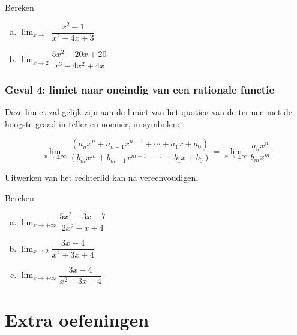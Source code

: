 \documentclass[12pt]{article}
\newenvironment{eigenschap}
{
  \vspace{0.4cm}
  \begin{mdframed}[nobreak=true,frametitle={Eigenschap}]
  }{%
  \end{mdframed}
}
\begin{document}
\begin{oefening}
  Bereken
  \begin{enumerate}[(a)]
  \itemsep.5em
  \item $\displaystyle\lim_{x\to1}\dfrac{x^2-1}{x^2-4x+3}$
  \item $\displaystyle\lim_{x\to2}\dfrac{5x^2-20x+20}{x^3-4x^2+4x}$
  \end{enumerate}
\end{oefening}

\begin{theorie}

\subsubsection*{Geval 4: limiet naar oneindig van een rationale functie}

Deze limiet zal gelijk zijn aan de limiet van het quotiën van de termen met de hoogste graad in teller en noemer, in symbolen:

\begin{eigenschap}
  $$\lim_{x\to \pm\infty}\dfrac{\left(a_nx^n+a_{n-1}x^{n-1}+\cdots+a_1x+a_0\right)}{\left(b_mx^m+b_{m-1}x^{m-1}+\cdots+b_1x+b_0\right)}=\lim_{x\to \pm\infty}\dfrac{a_nx^n}{b_mx^m}$$
\end{eigenschap}

Uitwerken van het rechterlid kan na vereenvoudigen.

\end{theorie}

\begin{oefening}
  Bereken
  \begin{enumerate}[(a)]
  \itemsep.5em
  \item $\displaystyle\lim_{x\to+\infty}\dfrac{5x^2+3x-7}{2x^2-x+4}$
  \item $\displaystyle\lim_{x\to2}\dfrac{3x-4}{x^2+3x+4}$
  \item $\displaystyle\lim_{x\to+\infty}\dfrac{3x-4}{x^2+3x+4}$
  \end{enumerate}
\end{oefening}

\pagebreak
\section{Extra oefeningen}
\end{document}

